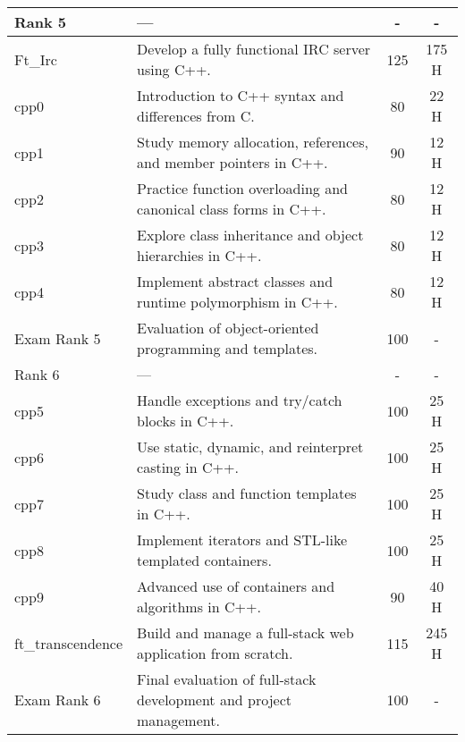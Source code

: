 \documentclass[11pt]{article}
\begin{document}
\begin{tabularx}{\textwidth}{l X c c}
\hline
Rank 5 & --- & - & - \\
\hline
Ft\_Irc & Develop a fully functional IRC server using C++. & 125 & 175 H \\
\hline
cpp0 & Introduction to C++ syntax and differences from C. & 80 & 22 H \\
\hline
cpp1 & Study memory allocation, references, and member pointers in C++. & 90 & 12 H \\
\hline
cpp2 & Practice function overloading and canonical class forms in C++. & 80 & 12 H \\
\hline
cpp3 & Explore class inheritance and object hierarchies in C++. & 80 & 12 H \\
\hline
cpp4 & Implement abstract classes and runtime polymorphism in C++. & 80 & 12 H \\
\hline
Exam Rank 5 & Evaluation of object-oriented programming and templates. & 100 & - \\
\hline
Rank 6 & --- & - & - \\
\hline
cpp5 & Handle exceptions and try/catch blocks in C++. & 100 & 25 H \\
\hline
cpp6 & Use static, dynamic, and reinterpret casting in C++. & 100 & 25 H \\
\hline
cpp7 & Study class and function templates in C++. & 100 & 25 H \\
\hline
cpp8 & Implement iterators and STL-like templated containers. & 100 & 25 H \\
\hline
cpp9 & Advanced use of containers and algorithms in C++. & 90 & 40 H \\
\hline
ft\_transcendence & Build and manage a full-stack web application from scratch. & 115 & 245 H \\
\hline
Exam Rank 6 & Final evaluation of full-stack development and project management. & 100 & - \\
\hline
\end{tabularx}
\end{document}
